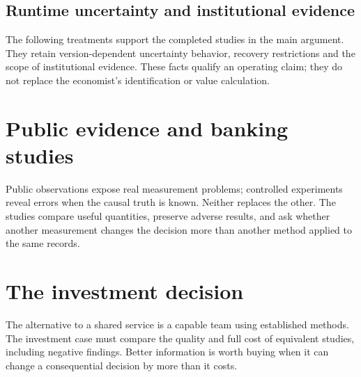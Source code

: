 \documentclass[11pt,a4paper,openany]{book}
\begin{document}
\chapter{Runtime uncertainty and institutional evidence}
The following treatments support the completed studies in the main argument.
They retain version-dependent uncertainty behavior, recovery restrictions
and the scope of institutional evidence. These facts qualify an operating
claim; they do not replace the economist's identification or value calculation.



\part{Public evidence and banking studies}
\label{reading:part-evidence}
Public observations expose real measurement problems; controlled
experiments reveal errors when the causal truth is known. Neither replaces
the other. The studies compare useful quantities, preserve adverse results,
and ask whether another measurement changes the decision more than another
method applied to the same records.



















\part{The investment decision}
\label{reading:part-investment}
The alternative to a shared service is a capable team using established
methods. The investment case must compare the quality and full cost of
equivalent studies, including negative findings. Better information is worth
buying when it can change a consequential decision by more than it costs.



\backmatter
\clearpage{}
{}


\end{document}
